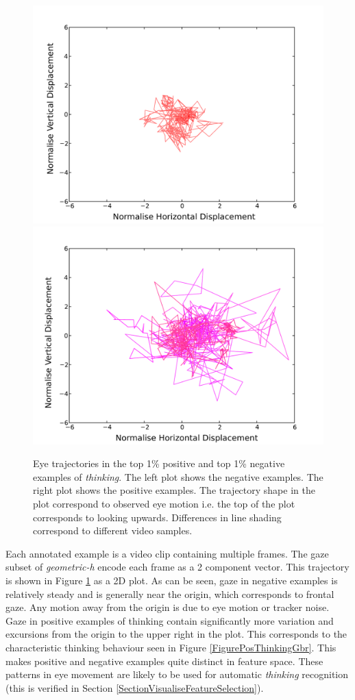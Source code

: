 \begin{figure}[tb]
\centering
\includegraphics[width = 0.49 \columnwidth]{nvcclass/traj0.pdf}
\includegraphics[width = 0.49 \columnwidth]{nvcclass/traj99.pdf}
\caption[Eye trajectories in the top 1\% positive and top 1\% negative examples of \textit{thinking}.]{Eye trajectories in the top 1\% positive and top 1\% negative examples of \textit{thinking}. The left plot shows the negative examples. The right plot shows the positive examples. The trajectory shape in the plot correspond to observed eye motion i.e. the top of the plot corresponds to looking upwards. Differences in line shading correspond to different video samples.}
\label{FigureThinkingTrajectoryPosNeg}
\end{figure}

Each annotated example is a video clip containing multiple frames. The gaze subset of \textit{geometric-h} encode each frame as a 2 component vector. This trajectory is shown in Figure \ref{FigureThinkingTrajectoryPosNeg} as a 2D plot. As can be seen, gaze in negative examples is relatively steady and is generally near the origin, which corresponds to frontal gaze. Any motion away from the origin is due to eye motion or tracker noise. Gaze in positive examples of thinking contain significantly more variation and excursions from the origin to the upper right in the plot. This corresponds to the characteristic thinking behaviour seen in Figure \ref{FigurePosThinkingGbr}. This makes positive and negative examples quite distinct in feature space. These patterns in eye movement are likely to be used for automatic \textit{thinking} recognition (this is verified in Section \ref{SectionVisualiseFeatureSelection}).

